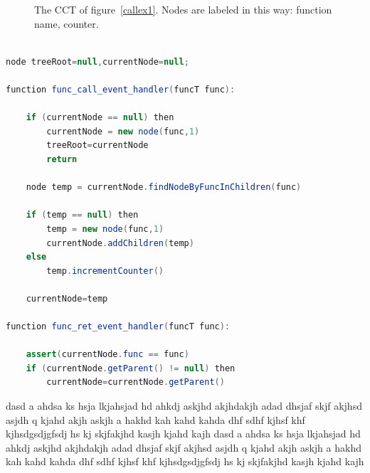 \documentclass[a4paper,11pt]{report}
\begin{document}
\begin{figure}[t]

\begin{center}
\end{center}

\caption{The CCT of figure~\ref{callex1}. Nodes are labeled in this way: function name, counter.}
\label{cct1}

\end{figure}
\begin{lstlisting}[language=java, morekeywords={function,then},frame=leftline,framesep=10pt]

node treeRoot=null,currentNode=null;

function func_call_event_handler(funcT func):

	if (currentNode == null) then 	
		currentNode = new node(func,1) 
		treeRoot=currentNode
		return

	node temp = currentNode.findNodeByFuncInChildren(func)

	if (temp == null) then
		temp = new node(func,1)
		currentNode.addChildren(temp)
	else
		temp.incrementCounter()

	currentNode=temp

function func_ret_event_handler(funcT func):

	assert(currentNode.func == func)
	if (currentNode.getParent() != null) then
		currentNode=currentNode.getParent()

\end{lstlisting}





dasd a ahdsa ks hsja   lkjahsjad hd ahkdj askjhd akjhdakjh adad
dhsjaf skjf akjhsd asjdh q kjahd akjh askjh a hakhd kah kahd kahda
dhf sdhf kjhsf khf kjhsdgsdjgfsdj hs kj  skjfakjhd kasjh kjahd kajh 
dasd a ahdsa ks hsja   lkjahsjad hd ahkdj askjhd akjhdakjh adad
dhsjaf skjf akjhsd asjdh q kjahd akjh askjh a hakhd kah kahd kahda
dhf sdhf kjhsf khf kjhsdgsdjgfsdj hs kj  skjfakjhd kasjh kjahd kajh 
\end{document}
